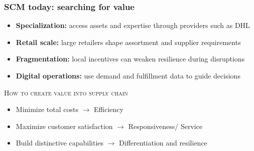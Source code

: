 \documentclass[10pt,handout]{beamer}
\begin{document}
\begin{frame}
  \frametitle{SCM today: searching for value}

  \begin{itemize}
    \item \textbf{Specialization:} access assets and expertise through providers such as DHL
    \item \textbf{Retail scale:} large retailers shape assortment and supplier requirements
    \item \textbf{Fragmentation:} local incentives can weaken resilience during disruptions
    \item \textbf{Digital operations:} use demand and fulfillment data to guide decisions
  \end{itemize}

  \NextLine
  \textsc{How to create value into supply chain}
  \begin{itemize}
    \item Minimize \alert{total costs} $\rightarrow$ Efficiency
    \item Maximize \alert{customer satisfaction} $\rightarrow$ Responsiveness/ Service
    \item Build \alert{distinctive capabilities} $\rightarrow$ Differentiation and resilience
  \end{itemize}


\end{frame}
\end{document}
